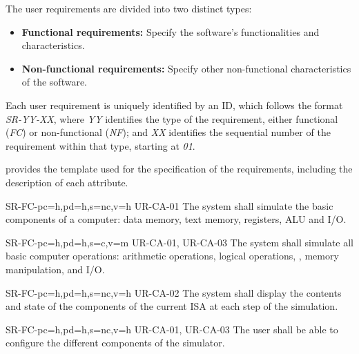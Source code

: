The user requirements are divided into two distinct types:
\begin{itemize}
  \item \textbf{Functional requirements:} Specify the software's functionalities and characteristics.
  \item \textbf{Non-functional requirements:} Specify other non-functional characteristics of the software.
\end{itemize}

Each user requirement is uniquely identified by an ID, which follows the format \textit{SR-YY-XX}, where \textit{YY} identifies the type of the requirement, either functional (\textit{FC}) or non-functional (\textit{NF}); and \textit{XX} identifies the sequential number of the requirement within that type, starting at \textit{01}.

 provides the template used for the specification of the requirements, including the description of each attribute.



\setcounter{i}{1}

\begin{softwareReq}{SR-FC-}{pc=h,pd=h,s=nc,v=h}
  {UR-CA-01}
  The system shall simulate the basic components of a computer: \gls{data memory}, \gls{text memory}, \glspl{register}, \gls{ALU} and \gls{I/O}.
\end{softwareReq}

\begin{softwareReq}{SR-FC-}{pc=h,pd=h,s=c,v=m}
  {UR-CA-01, UR-CA-03}
  The system shall simulate all basic computer operations: \glspl{arithmetic operation}, \glspl{logical operation}, , \gls{memory} manipulation, and \gls{I/O}.
\end{softwareReq}

\begin{softwareReq}{SR-FC-}{pc=h,pd=h,s=nc,v=h}
  {UR-CA-02}
  The system shall display the contents and state of the components of the current \gls{ISA} at each step of the simulation.
\end{softwareReq}

\begin{softwareReq}{SR-FC-}{pc=h,pd=h,s=nc,v=h}
  {UR-CA-01, UR-CA-03}
  The user shall be able to configure the different components of the simulator.
\end{softwareReq}

